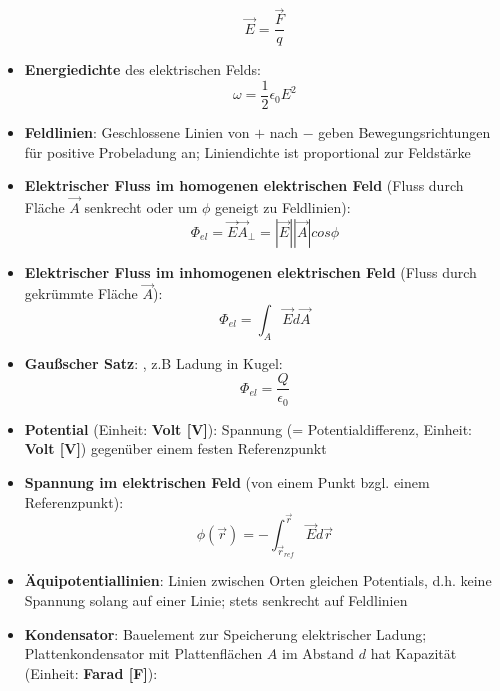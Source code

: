 \begin{itemize}
	\begin{equation}
		\vec{E} = \frac{\vec{F}}{q}
	\end{equation}
	\item \textbf{Energiedichte} des elektrischen Felds:
	\begin{equation}
		\omega = \frac{1}{2}\epsilon_0E^2
	\end{equation}
	\item \textbf{Feldlinien}: Geschlossene Linien von $+$ nach $-$ geben Bewegungsrichtungen für positive Probeladung an; Liniendichte ist proportional zur Feldstärke
	\item \textbf{Elektrischer Fluss im homogenen elektrischen Feld} (Fluss durch Fläche $\vec{A}$ senkrecht oder um $\phi$ geneigt zu Feldlinien):
	\begin{equation}
		\Phi_{el} = \vec{E}\vec{A}_\perp = |\vec{E}||\vec{A}|cos\phi
	\end{equation}
	\item \textbf{Elektrischer Fluss im inhomogenen elektrischen Feld} (Fluss durch gekrümmte Fläche $\vec{A}$):
	\begin{equation}
		\Phi_{el} = \int_A \vec{E}d\vec{A}
	\end{equation}
	\item \textbf{Gaußscher Satz}: , z.B Ladung in Kugel:
	\begin{equation}
		\Phi_{el} = \frac{Q}{\epsilon_0}
	\end{equation}
	\item \textbf{Potential} (Einheit: \textbf{Volt [V]}): Spannung (= Potentialdifferenz, Einheit: \textbf{Volt [V]}) gegenüber einem festen Referenzpunkt
	\item \textbf{Spannung im elektrischen Feld} (von einem Punkt bzgl. einem Referenzpunkt):
	\begin{equation}
		\phi(\vec{r}) = -\int_{\vec{r}_{ref}}^{\vec{r}} \vec{E}d\vec{r}
	\end{equation}
	\item \textbf{Äquipotentiallinien}: Linien zwischen Orten gleichen Potentials, d.h. keine Spannung solang auf einer Linie; stets senkrecht auf Feldlinien
	\item \textbf{Kondensator}: Bauelement zur Speicherung elektrischer Ladung; Plattenkondensator mit Plattenflächen $A$ im Abstand $d$ hat Kapazität (Einheit: \textbf{Farad [F]}):
	\begin{equation}

\end{equation}
\end{itemize}
